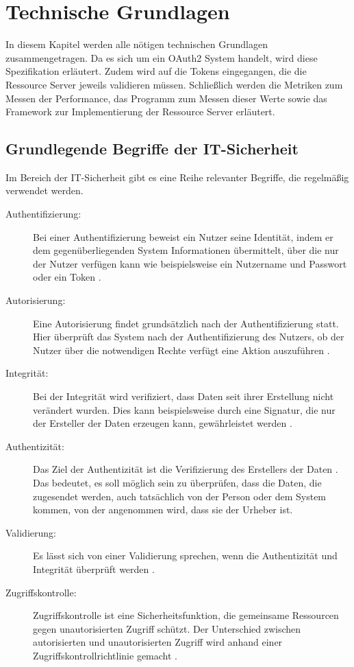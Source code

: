 \chapter{Technische Grundlagen}
\label{sec:TechnischeGrundlagen}
In diesem Kapitel werden alle nötigen technischen Grundlagen zusammengetragen. Da es sich um ein OAuth2 System handelt, wird diese Spezifikation erläutert. Zudem wird auf die Tokens eingegangen, die die Ressource Server jeweils validieren müssen. Schließlich werden die Metriken zum Messen der Performance, das Programm zum Messen dieser Werte sowie das Framework zur Implementierung der Ressource Server erläutert.

%
%
\section{Grundlegende Begriffe der IT-Sicherheit}
\label{sec:GrundlegenderBegriffederIT-Sicherheit}
Im Bereich der IT-Sicherheit gibt es eine Reihe relevanter Begriffe, die regelmäßig verwendet werden.

\begin{description}
  \item[Authentifizierung:] Bei einer Authentifizierung beweist ein Nutzer seine Identität, indem er dem gegenüberliegenden System Informationen übermittelt, über die nur der Nutzer verfügen kann wie beispielsweise ein Nutzername und Passwort oder ein Token \citep{Cankaya2011}.
  \item[Autorisierung:] Eine Autorisierung findet grundsätzlich nach der Authentifizierung statt. Hier überprüft das System nach der Authentifizierung des Nutzers, ob der Nutzer über die notwendigen Rechte verfügt eine Aktion auszuführen \citep{Authorization2011}. 
  \item[Integrität:] Bei der Integrität wird verifiziert, dass Daten seit ihrer Erstellung nicht verändert wurden. Dies kann beispielsweise durch eine Signatur, die nur der Ersteller der Daten erzeugen kann, gewährleistet werden \citep{connect2id:2021}.
  \item[Authentizität:] Das Ziel der Authentizität ist die Verifizierung des Erstellers der Daten \citep{connect2id:2021}. Das bedeutet, es soll möglich sein zu überprüfen, dass die Daten, die zugesendet werden, auch tatsächlich von der Person oder dem System kommen, von der angenommen wird, dass sie der Urheber ist.
  \item[Validierung:] Es lässt sich von einer Validierung sprechen, wenn die Authentizität und Integrität überprüft werden \citep{springsecuritydoc:2021}.
  \item[Zugriffskontrolle:] Zugriffskontrolle ist eine Sicherheitsfunktion, die gemeinsame Ressourcen gegen unautorisierten Zugriff schützt. Der Unterschied zwischen autorisierten und unautorisierten Zugriff wird anhand einer Zugriffskontrollrichtlinie gemacht \citep{Brose2011}. 
\end{description}

